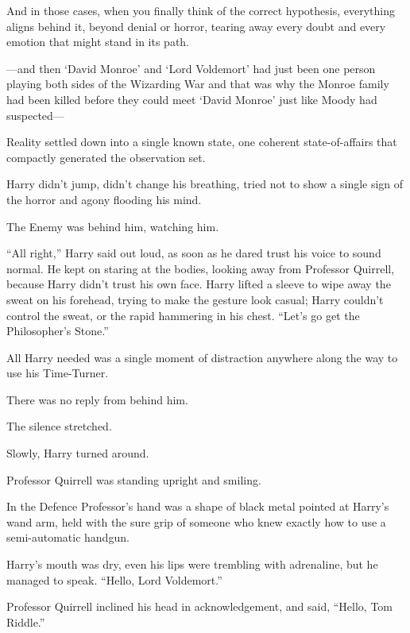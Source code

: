 And in those cases, when you finally think of the correct hypothesis, everything aligns behind it, beyond denial or horror, tearing away every doubt and every emotion that might stand in its path.

—and then ‘David Monroe’ and ‘Lord Voldemort’ had just been one person playing both sides of the Wizarding War and that was why the Monroe family had been killed before they could meet ‘David Monroe’ just like Moody had suspected—

Reality settled down into a single known state, one coherent state-of-affairs that compactly generated the observation set.

Harry didn’t jump, didn’t change his breathing, tried not to show a single sign of the horror and agony flooding his mind.

The Enemy was behind him, watching him.

“All right,” Harry said out loud, as soon as he dared trust his voice to sound normal. He kept on staring at the bodies, looking away from Professor Quirrell, because Harry didn’t trust his own face. Harry lifted a sleeve to wipe away the sweat on his forehead, trying to make the gesture look casual; Harry couldn’t control the sweat, or the rapid hammering in his chest. “Let’s go get the Philosopher’s Stone.”

All Harry needed was a single moment of distraction anywhere along the way to use his Time-Turner.

There was no reply from behind him.

The silence stretched.

Slowly, Harry turned around.

Professor Quirrell was standing upright and smiling.

In the Defence Professor’s hand was a shape of black metal pointed at Harry’s wand arm, held with the sure grip of someone who knew exactly how to use a semi-automatic handgun.

Harry’s mouth was dry, even his lips were trembling with adrenaline, but he managed to speak. “Hello, Lord Voldemort.”

Professor Quirrell inclined his head in acknowledgement, and said, “Hello, Tom Riddle.”

